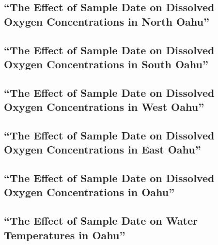 \documentclass[12pt,]{article}
\begin{document}
\subsection{\texorpdfstring{``The Effect of Sample Date on Dissolved
Oxygen Concentrations in North
Oahu''}{The Effect of Sample Date on Dissolved Oxygen Concentrations in North Oahu}}\label{the-effect-of-sample-date-on-dissolved-oxygen-concentrations-in-north-oahu}

\subsection{\texorpdfstring{``The Effect of Sample Date on Dissolved
Oxygen Concentrations in South
Oahu''}{The Effect of Sample Date on Dissolved Oxygen Concentrations in South Oahu}}\label{the-effect-of-sample-date-on-dissolved-oxygen-concentrations-in-south-oahu}

\subsection{\texorpdfstring{``The Effect of Sample Date on Dissolved
Oxygen Concentrations in West
Oahu''}{The Effect of Sample Date on Dissolved Oxygen Concentrations in West Oahu}}\label{the-effect-of-sample-date-on-dissolved-oxygen-concentrations-in-west-oahu}

\subsection{\texorpdfstring{``The Effect of Sample Date on Dissolved
Oxygen Concentrations in East
Oahu''}{The Effect of Sample Date on Dissolved Oxygen Concentrations in East Oahu}}\label{the-effect-of-sample-date-on-dissolved-oxygen-concentrations-in-east-oahu}

\subsection{\texorpdfstring{``The Effect of Sample Date on Dissolved
Oxygen Concentrations in
Oahu''}{The Effect of Sample Date on Dissolved Oxygen Concentrations in Oahu}}\label{the-effect-of-sample-date-on-dissolved-oxygen-concentrations-in-oahu}

\subsection{\texorpdfstring{``The Effect of Sample Date on Water
Temperatures in
Oahu''}{The Effect of Sample Date on Water Temperatures in Oahu}}\label{the-effect-of-sample-date-on-water-temperatures-in-oahu}
\end{document}
